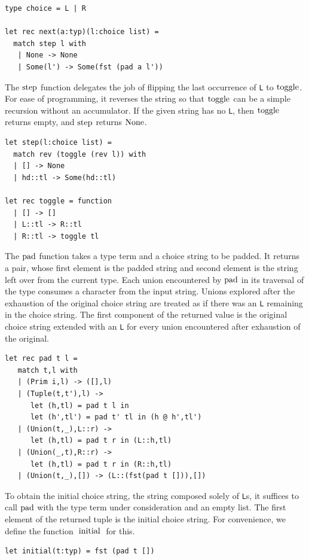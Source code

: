 \documentclass[a4paper,english]{lipics-v2019}
\renewcommand{\L}{{\tt L}\xspace}
\newcommand{\Ls}{{\tt L}s\xspace}
\renewcommand{\c}[1]{\ensuremath{\text{\lstinline{#1}}}\xspace}
\begin{document}
\begin{lstlisting}
type choice = L | R

let rec next(a:typ)(l:choice list) = 
  match step l with
   | None -> None
   | Some(l') -> Some(fst (pad a l'))
\end{lstlisting}

\noindent
The \c{step} function delegates the job of flipping the last occurrence of
\L to \c{toggle}. For ease of programming, it reverses the string so that
\c{toggle} can be a simple recursion without an accumulator.  If the given
string has no \L, then \c{toggle} returns empty, and \c{step} returns
\c{None}.

\begin{lstlisting}
let step(l:choice list) =
  match rev (toggle (rev l)) with
  | [] -> None
  | hd::tl -> Some(hd::tl)

let rec toggle = function
  | [] -> []    
  | L::tl -> R::tl
  | R::tl -> toggle tl
\end{lstlisting}

\noindent The \c{pad} function takes a type term and a choice string to be
padded. It returns a pair, whose first element is the padded string and second
element is the string left over from the current type. Each union encountered
by \c{pad} in its traversal of the type consumes a character from the input
string. Unions explored after the exhaustion of the original choice string are
treated as if there was an \L remaining in the choice string. The first
component of the returned value is the original choice string
extended with an \L for every union encountered after exhaustion of the original.

\begin{lstlisting}
let rec pad t l =
   match t,l with
   | (Prim i,l) -> ([],l)
   | (Tuple(t,t'),l) -> 
      let (h,tl) = pad t l in
      let (h',tl') = pad t' tl in (h @ h',tl')
   | (Union(t,_),L::r) -> 
      let (h,tl) = pad t r in (L::h,tl)
   | (Union(_,t),R::r) -> 
      let (h,tl) = pad t r in (R::h,tl)
   | (Union(t,_),[]) -> (L::(fst(pad t [])),[])
\end{lstlisting}

\noindent
To obtain the initial choice string, the string composed solely of \Ls, it
suffices to call \c{pad} with the type term under consideration and an empty
list. The first element of the returned tuple is the initial choice
string. For convenience, we define the function \c{initial} for this.

\begin{lstlisting}
let initial(t:typ) = fst (pad t [])
\end{lstlisting}
\end{document}
